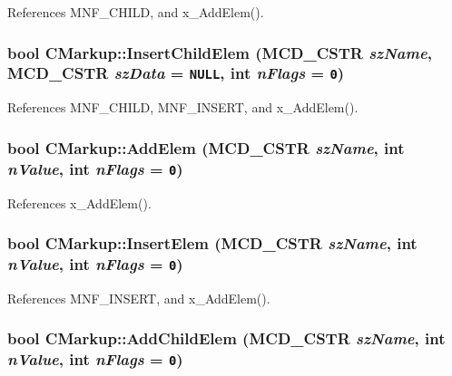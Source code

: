 References MNF\_\-CHILD, and x\_\-AddElem().
\subsubsection[InsertChildElem]{\setlength{\rightskip}{0pt plus 5cm}bool CMarkup::InsertChildElem ({\bf MCD\_\-CSTR} {\em szName}, \/  {\bf MCD\_\-CSTR} {\em szData} = {\tt NULL}, \/  int {\em nFlags} = {\tt 0})\hspace{0.3cm}{\tt  [inline]}}\label{classCMarkup_e7ec8b7cc039f3308ab23a1465883061}




References MNF\_\-CHILD, MNF\_\-INSERT, and x\_\-AddElem().
\subsubsection[AddElem]{\setlength{\rightskip}{0pt plus 5cm}bool CMarkup::AddElem ({\bf MCD\_\-CSTR} {\em szName}, \/  int {\em nValue}, \/  int {\em nFlags} = {\tt 0})\hspace{0.3cm}{\tt  [inline]}}\label{classCMarkup_4ed6f7e35a579b846c3a7cc8cae55bf3}




References x\_\-AddElem().
\subsubsection[InsertElem]{\setlength{\rightskip}{0pt plus 5cm}bool CMarkup::InsertElem ({\bf MCD\_\-CSTR} {\em szName}, \/  int {\em nValue}, \/  int {\em nFlags} = {\tt 0})\hspace{0.3cm}{\tt  [inline]}}\label{classCMarkup_d0548425b4e5e0522b33a9f5e30c36ca}




References MNF\_\-INSERT, and x\_\-AddElem().
\subsubsection[AddChildElem]{\setlength{\rightskip}{0pt plus 5cm}bool CMarkup::AddChildElem ({\bf MCD\_\-CSTR} {\em szName}, \/  int {\em nValue}, \/  int {\em nFlags} = {\tt 0})\hspace{0.3cm}{\tt  [inline]}}\label{classCMarkup_a5d807472725dd66a45a94ca9b0e7e35}




